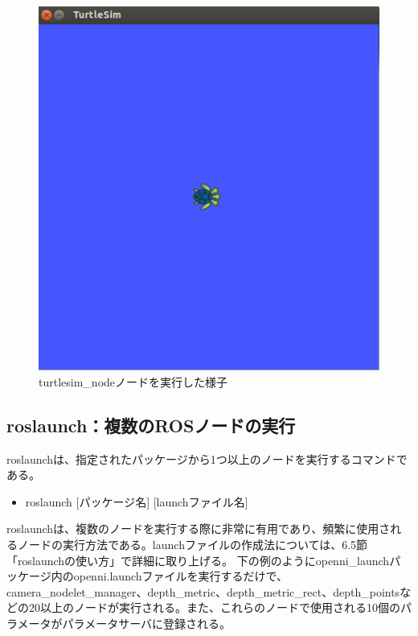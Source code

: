 \begin{figure}[htp]
  \centering
  \includegraphics[width=\columnwidth]{pictures/chapter4/pic_04_01.png}
  \caption{turtlesim\_nodeノードを実行した様子}
\end{figure}


\subsection{roslaunch：複数のROSノードの実行}

roslaunchは、指定されたパッケージから1つ以上のノードを実行するコマンドである。

\begin{itemize}
\item   roslaunch [パッケージ名] [launchファイル名]
\end{itemize}

roslaunchは、複数のノードを実行する際に非常に有用であり、頻繁に使用されるノードの実行方法である。launchファイルの作成法については、6.5節「roslaunchの使い方」で詳細に取り上げる。
下の例のようにopenni\_launchパッケージ内のopenni.launchファイルを実行するだけで、camera\_nodelet\_manager、depth\_metric、depth\_metric\_rect、depth\_pointsなどの20以上のノードが実行される。また、これらのノードで使用される10個のパラメータがパラメータサーバに登録される。

